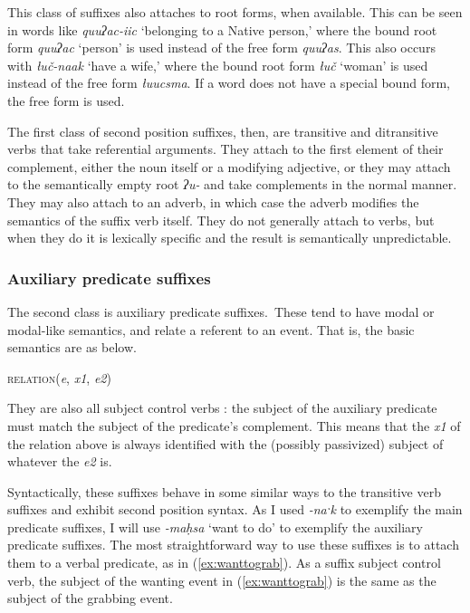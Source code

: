 This class of suffixes also attaches to root forms, when available. This can be seen in words like \textit{quuʔac-iic} `belonging to a Native person,' where the bound root form \textit{quuʔac} `person' is used instead of the free form \textit{quuʔas}. This also occurs with \textit{łuč-naak} `have a wife,' where the bound root form \textit{łuč} `woman' is used instead of the free form \textit{łuucsma}. If a word does not have a special bound form, the free form is used.

The first class of second position suffixes, then, are transitive and ditransitive verbs that take referential arguments. They attach to the first element of their complement, either the noun itself or a modifying adjective, or they may attach to the semantically empty root \textit{ʔu-} and take complements in the normal manner. They may also attach to an adverb, in which case the adverb modifies the semantics of the suffix verb itself. They do not generally attach to verbs, but when they do it is lexically specific and the result is semantically unpredictable.

\subsubsection{Auxiliary predicate suffixes} \label{ch:clause:2pv:auxiliary}

The second class is auxiliary predicate suffixes. These tend to have modal or modal-like semantics, and relate a referent to an event. That is, the basic semantics are as below.

\ex
\textsc{relation}(\textit{e}, \textit{x1}, \textit{e2})
\xe

They are also all subject control verbs \citep[p.\ 160]{wojdak2005}: the subject of the auxiliary predicate must match the subject of the predicate's complement. This means that the \textit{x1} of the relation above is always identified with the (possibly passivized) subject of whatever the \textit{e2} is.

Syntactically, these suffixes behave in some similar ways to the transitive verb suffixes and exhibit second position syntax. As I used \textit{-naˑk} to exemplify the main predicate suffixes, I will use \textit{-maḥsa} `want to do' to exemplify the auxiliary predicate suffixes. The most straightforward way to use these suffixes is to attach them to a verbal predicate, as in (\ref{ex:wanttograb}). As a suffix subject control verb, the subject of the wanting event in (\ref{ex:wanttograb}) is the same as the subject of the grabbing event.

